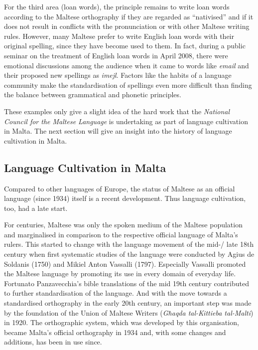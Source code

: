 \begin{multicols}{2}
For the third area (loan words), the principle remains to write loan words according to the Maltese orthography if they are regarded as ``nativised'' and if it does not result in conflicts with the pronunciation or with other Maltese writing rules. However, many Maltese prefer to write English loan words with their original spelling, since they have become used to them. In fact, during a public seminar on the treatment of English loan words in April 2008, there were emotional discussions among the audience when it came to words like \emph{email} and their proposed new spellings as \emph{imejl}. Factors like the habits of a language community make the standardisation of spellings even more difficult than finding the balance between grammatical and phonetic principles. 

These examples only give a slight idea of the hard work that the \emph{National Council for the Maltese Language} is undertaking as part of language cultivation in Malta. The next section will give an insight into the history of language cultivation in Malta.

\subsection{Language Cultivation in Malta}

Compared to other languages of Europe, the status of Maltese as an official language (since 1934) itself is a recent development. Thus language cultivation, too, had a late start. 

For centuries, Maltese was only the spoken medium of the Maltese population and marginalised in comparison to the respective official language of Malta's rulers. This started to change with the language movement of the mid-/ late 18th century when first systematic studies of the language were conducted by Agius de Soldanis (1750) and Mikiel Anton Vassalli (1797). Especially Vassalli promoted the Maltese language by promoting its use in every domain of everyday life. Fortunato Panzavecchia's bible translations of the mid 19th century contributed to further standardisation of the language. And with the move towards a standardised orthography in the early 20th century, an important step was made by the foundation of the Union of Maltese Writers (\emph{Għaqda tal-Kittieba tal-Malti}) in 1920. The orthographic system, which was developed by this organisation, became Malta's official orthography in 1934 and, with some changes and additions, has been in use since.


\end{multicols}

